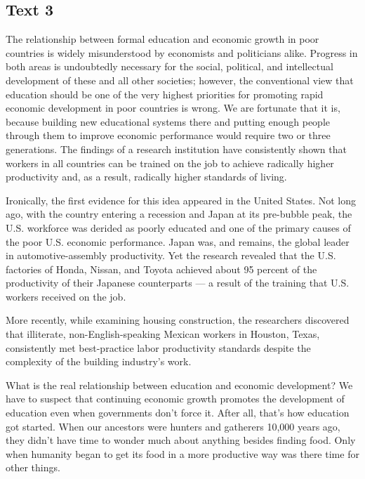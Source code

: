 \documentclass[UTF8,11pt]{ctexart}
\begin{document}
\subsection*{\textbf{Text 3}}


The relationship between formal education and economic growth in poor countries is widely misunderstood by economists and politicians alike. Progress in both areas is undoubtedly necessary for the social, political, and intellectual development of these and all other societies; however, the conventional view that education should be one of the very highest priorities for promoting rapid economic development in poor countries is wrong. We are fortunate that it is, because building new educational systems there and putting enough people through them to improve economic performance would require two or three generations. The findings of a research institution have consistently shown that workers in all countries can be trained on the job to achieve radically higher productivity and, as a result, radically higher standards of living.


Ironically, the first evidence for this idea appeared in the United States. Not long ago, with the country entering a recession and Japan at its pre-bubble peak, the U.S. workforce was derided as poorly educated and one of the primary causes of the poor U.S. economic performance. Japan was, and remains, the global leader in automotive-assembly productivity. Yet the research revealed that the U.S. factories of Honda, Nissan, and Toyota achieved about 95 percent of the productivity of their Japanese counterparts — a result of the training that U.S. workers received on the job.


More recently, while examining housing construction, the researchers discovered that illiterate, non-English-speaking Mexican workers in Houston, Texas, consistently met best-practice labor productivity standards despite the complexity of the building industry’s work.


What is the real relationship between education and economic development? We have to suspect that continuing economic growth promotes the development of education even when governments don’t force it. After all, that’s how education got started. When our ancestors were hunters and gatherers 10,000 years ago, they didn’t have time to wonder much about anything besides finding food. Only when humanity began to get its food in a more productive way was there time for other things.
\end{document}
